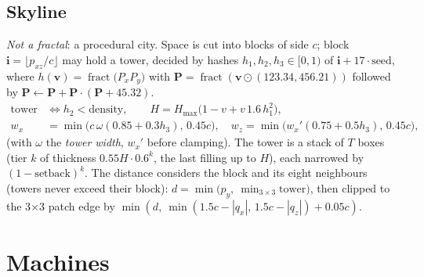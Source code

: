 \documentclass[10pt,a4paper]{article}
\newcommand{\vv}[1]{\mathbf{#1}}
\newcommand{\abs}[1]{\left|#1\right|}
\newcommand{\fract}{\operatorname{fract}}
\begin{document}
\subsection{Skyline}
\emph{Not a fractal}: a procedural city. Space is cut into blocks of side $c$; block $\vv i=\lfloor p_{xz}/c\rfloor$ may hold a tower, decided by hashes $h_1,h_2,h_3\in[0,1)$ of $\vv i+17\cdot\text{seed}$, where $h(\vv v)=\fract\!\big(P_x P_y\big)$ with $\vv P=\fract(\vv v\odot(123.34,456.21))$ followed by $\vv P\leftarrow\vv P+\vv P\!\cdot(\vv P+45.32)$.
\begin{align}
\text{tower exists}&\iff h_2<\text{density},\qquad H=H_{\max}\big(1-v+v\,1.6\,h_1^2\big),\\
w_x&=\min\!\big(c\,\omega(0.85+0.3h_3),\,0.45c\big),\quad w_z=\min\!\big(w_x'(0.75+0.5h_3),\,0.45c\big),
\end{align}
(with $\omega$ the \emph{tower width}, $w_x'$ before clamping). The tower is a stack of $T$ boxes (tier $k$ of thickness $0.55H\cdot0.6^k$, the last filling up to $H$), each narrowed by $(1-\text{setback})^k$.
The distance considers the block and its eight neighbours (towers never exceed their block): $d=\min\big(p_y,\ \min_{3\times3}\mathrm{tower}\big)$, then clipped to the 3$\times$3 patch edge by $\min(d,\ \min(1.5c-\abs{q_x},\,1.5c-\abs{q_z})+0.05c)$.


\section{Machines}
\end{document}
